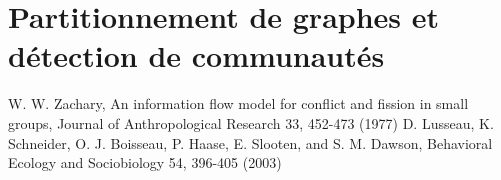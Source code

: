 \documentclass[12pt]{article}
\begin{document}
\section{Partitionnement de graphes et détection de communautés}

\begin{thebibliography}{2}
 W. W. Zachary, An information flow model for conflict and fission in small groups, Journal of Anthropological Research 33, 452-473 (1977)
 D. Lusseau, K. Schneider, O. J. Boisseau, P. Haase, E. Slooten, and S. M. Dawson, Behavioral Ecology and Sociobiology 54, 396-405 (2003)
\end{thebibliography}
\end{document}
